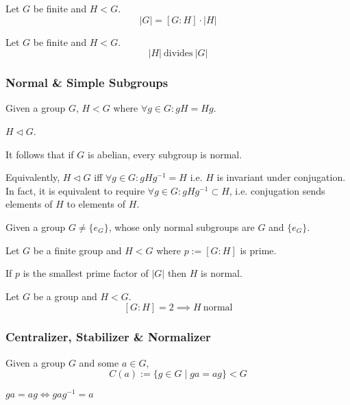 \begin{proposition}\label{pro:index_formula}
   Let \(G\) be finite and \(H < G\).
   \[|G| = [G:H] \cdot |H|\]
\end{proposition}

\begin{corollary}
   Let \(G\) be finite and \(H < G\).
   \[|H|~\text{divides}~|G|\]
\end{corollary}

\subsubsection{Normal \& Simple Subgroups}
\begin{definition}
   Given a group \(G\), \(H < G\) where \(\forall g \in G: gH = Hg\).
\end{definition}
\begin{remark}[Notation]
   \(H \triangleleft G\).
\end{remark}
\begin{remark}
   It follows that if \(G\) is abelian, every subgroup is normal.
\end{remark}
\begin{remark}
   Equivalently, \(H \triangleleft G\) iff \(\forall g \in G: gHg^{-1} = H\) i.e. \(H\) is invariant under conjugation.
   In fact, it is equivalent to require \(\forall g \in G: gHg^{-1} \subset H\), i.e. conjugation sends elements of \(H\) to elements of \(H\).
\end{remark}

\begin{definition}
   Given a group \(G \neq \{e_G\}\), whose only normal subgroups are \(G\) and \(\{e_G\}\).
\end{definition}

\begin{proposition}
   Let \(G\) be a finite group and \(H < G\) where \(p := [G:H]\) is prime.

   If \(p\) is the smallest prime factor of \(|G|\) then \(H\) is normal.
\end{proposition}

\begin{proposition}
   Let \(G\) be a group and \(H < G\).
   \[[G:H] = 2 \implies H~\text{normal}\]
\end{proposition}

\subsubsection{Centralizer, Stabilizer \& Normalizer}
\begin{definition}[Centralizer]
   Given a group \(G\) and some \(a \in G\),
   \[C(a) := \{g \in G \mid ga = ag\} < G\]
\end{definition}
\begin{remark}
   \(ga = ag \iff gag^{-1} = a\)
\end{remark}

